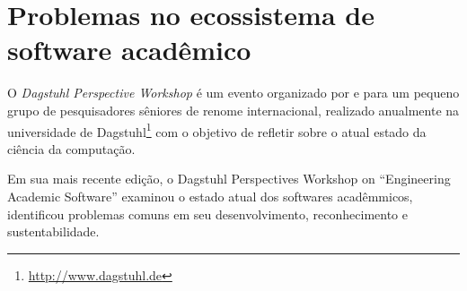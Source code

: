 
\section{Problemas no ecossistema de software acadêmico}



O {\it Dagstuhl Perspective Workshop} é um evento organizado por e para um
pequeno grupo de pesquisadores sêniores de renome internacional, realizado
anualmente na universidade de Dagstuhl\footnote{\url{http://www.dagstuhl.de}}
com o objetivo de refletir sobre o atual estado da ciência da computação.

%

Em sua mais recente edição, o Dagstuhl Perspectives Workshop on ``Engineering
Academic Software'' \cite{allen2017engineering} examinou o estado atual dos
softwares acadêmmicos, identificou problemas comuns em seu desenvolvimento,
reconhecimento e sustentabilidade.

